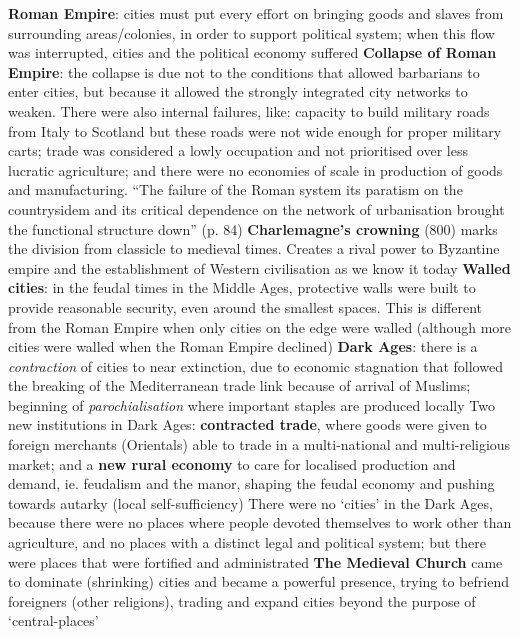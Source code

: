 \documentclass{article}
\begin{document}
\begin{outline}
	\1 \textbf{Roman Empire}: cities must put every effort on bringing goods and slaves from surrounding areas/colonies, in order to support political system; when this flow was interrupted, cities and the political economy suffered
		\2 \textbf{Collapse of Roman Empire}: the collapse is due not to the conditions that allowed barbarians to enter cities, but because it allowed the strongly integrated city networks to weaken. There were also internal failures, like: capacity to build military roads from Italy to Scotland but these roads were not wide enough for proper military carts; trade was considered a lowly occupation and not prioritised over less lucratic agriculture; and there were no economies of scale in production of goods and manufacturing. ``The failure of the Roman system its paratism on the countrysidem and its critical dependence on the network of urbanisation brought the functional structure down'' (p. 84)
		\2 \textbf{Charlemagne's crowning} (800) marks the division from classicle to medieval times. Creates a rival power to Byzantine empire and the establishment of Western civilisation as we know it today
	\1 \textbf{Walled cities}: in the feudal times in the Middle Ages, protective walls were built to provide reasonable security, even around the smallest spaces. This is different from the Roman Empire when only cities on the edge were walled (although more cities were walled when the Roman Empire declined)
	\1 \textbf{Dark Ages}: there is a \textit{contraction} of cities to near extinction, due to economic stagnation that followed the breaking of the Mediterranean trade link because of arrival of Muslims; beginning of \textit{parochialisation} where important staples are produced locally
		\2 Two new institutions in Dark Ages: \textbf{contracted trade}, where goods were given to foreign merchants (Orientals) able to trade in a multi-national and multi-religious market; and a \textbf{new rural economy} to care for localised production and demand, ie. feudalism and the manor, shaping the feudal economy and pushing towards autarky (local self-sufficiency)
		\2 There were no `cities' in the Dark Ages, because there were no places where people devoted themselves to work other than agriculture, and no places with a distinct legal and political system; but there were places that were fortified and administrated
	\1 \textbf{The Medieval Church} came to dominate (shrinking) cities and became a powerful presence, trying to befriend foreigners (other religions),  trading and expand cities beyond the purpose of `central-places'

\end{outline}
\end{document}
